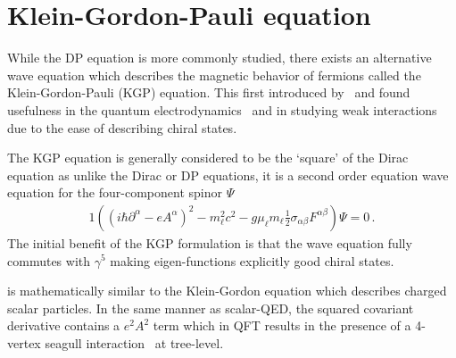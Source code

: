 \section{Klein-Gordon-Pauli equation}
\label{sec:kgp}
\noindent While the DP equation is more commonly studied, there exists an alternative wave equation which describes the magnetic behavior of fermions called the Klein-Gordon-Pauli (KGP) equation. This first introduced by~\cite{Fock:1937dy} and found usefulness in the quantum electrodynamics~\citep{Feynman:1951gn} and in studying weak interactions~\citep{Feynman:1958ty} due to the ease of describing chiral states.

The KGP equation is generally considered to be the `square' of the Dirac equation as unlike the Dirac or DP equations, it is a second order equation wave equation for the four-component spinor $\Psi$
\begin{alignat}{1}
	\label{kgp:1} \left((i\hbar\partial^{\alpha}-eA^{\alpha})^{2}-m_{\ell}^{2}c^{2}-g\mu_{\ell}m_{\ell}\frac{1}{2}\sigma_{\alpha\beta}F^{\alpha\beta}\right)\Psi=0\,.
\end{alignat}
The initial benefit of the KGP formulation is that the wave equation fully commutes with $\gamma^{5}$ making eigen-functions explicitly good chiral states.

 is mathematically similar to the Klein-Gordon equation which describes charged scalar particles. In the same manner as scalar-QED, the squared covariant derivative contains a $e^{2}A^{2}$ term which in QFT results in the presence of a 4-vertex seagull interaction~\citep{Schwartz:2014sze} at tree-level.

